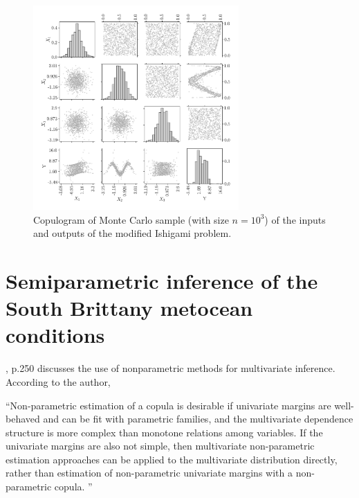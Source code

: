 \begin{figure}
    \centering
    \includegraphics[width=0.7\textwidth]{../numerical_experiments/chapter3/figures/ishigami_copluogram.png}
    \caption{Copulogram of Monte Carlo sample (with size $n=10^3$) of the inputs and outputs of the modified Ishigami problem.}
    \label{fig:ishigami_copulogram}
\end{figure}



\newpage
\section{Semiparametric inference of the South Brittany metocean conditions} \label{sec:32_inference}


\citet{joe_2014}, p.250 discusses the use of nonparametric methods for multivariate inference. 
According to the author, 

``Non-parametric estimation of a copula is desirable if univariate margins are well-behaved and can be fit with parametric families, 
and the multivariate dependence structure is more complex than monotone relations among variables. 
If the univariate margins are also not simple, then multivariate non-parametric estimation approaches can be applied to the multivariate distribution directly, 
rather than estimation of non-parametric univariate margins with a non-parametric copula.
''

